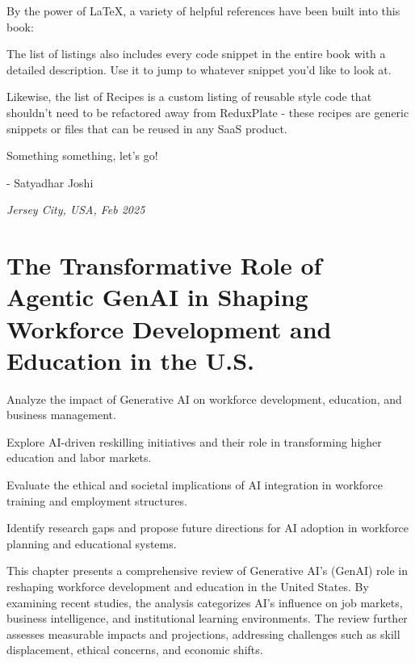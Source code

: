 \documentclass[a4paper,headinclude=on,footinclude=on,12pt,oneside]{scrbook}
\begin{document}

By the power of LaTeX, a variety of helpful references have been built into this book:



The list of listings also includes every code snippet in the entire book with a detailed description. Use it to jump to whatever snippet you'd like to look at.

Likewise, the list of Recipes is a custom listing of reusable style code that shouldn't need to be refactored away from ReduxPlate - these recipes are generic snippets or files that can be reused in any SaaS product.


Something something, let's go!

- Satyadhar Joshi

\textit{Jersey City, USA, Feb 2025}




\chapter{The Transformative Role of Agentic GenAI in Shaping Workforce Development and Education in the U.S.}

\begin{arrows}
	\item Analyze the impact of Generative AI on workforce development, education, and business management.
	\item Explore AI-driven reskilling initiatives and their role in transforming higher education and labor markets.
	\item Evaluate the ethical and societal implications of AI integration in workforce training and employment structures.
	\item Identify research gaps and propose future directions for AI adoption in workforce planning and educational systems.
\end{arrows}

This chapter presents a comprehensive review of Generative AI's (GenAI) role in reshaping workforce development and education in the United States. By examining recent studies, the analysis categorizes AI's influence on job markets, business intelligence, and institutional learning environments. The review further assesses measurable impacts and projections, addressing challenges such as skill displacement, ethical concerns, and economic shifts.
\end{document}

